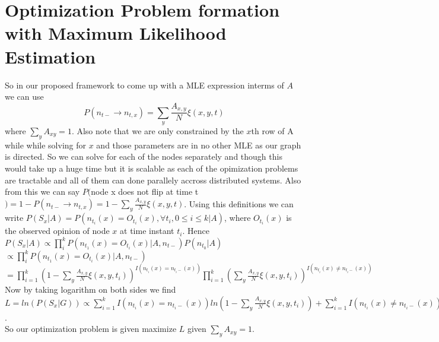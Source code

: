\section*{Optimization Problem formation with Maximum Likelihood Estimation}
So in our proposed framework to come up with a MLE expression interms of $A$ we can use 
\begin{equation}
P(n_{t-} \rightarrow n_{t,x}) = \displaystyle\sum_{y} \frac{A_{x,y}}{N} \xi (x,y,t)
\end{equation}
where $\displaystyle\sum_{y} A_{xy}= 1$. Also note that we are only constrained by the $x$th row of A while while solving for $x$ and those parameters are in no other MLE as our graph is directed. So we can solve for each of the nodes separately and though this would take up a huge time but it is scalable as each of the opimization problems are tractable and all of them can done parallely accross distributed systems. Also from this we can say $P($node x does not flip at time t$) = 1 - P(n_{t-} \rightarrow n_{t,x}) = 1 - \displaystyle\sum_{y} \frac{A_{x,y}}{N} \xi (x,y,t)$. Using this definitions we can write $P(S_x|A) = P(n_{t_{i}}(x) = O_{t_{i}}(x),\forall t_i, 0 \leq i \leq k|A)$, where $O_{t_{i}}(x)$ is the observed opinion of node $x$ at time instant $t_i$. Hence\\
$P(S_x|A) \propto \displaystyle\prod_{i}^{k} P(n_{t_1}(x) = O_{t_i}(x)|A,n_{t-})P(n_{t_0}|A)$\\
$ \propto \displaystyle\prod_{i}^{k} P(n_{t_1}(x) = O_{t_i}(x)|A,n_{t-})$\\
$ = \displaystyle\prod_{i=1}^{k}(1 - \displaystyle\sum_{y} \frac{A_{x,y}}{N} \xi (x,y,t_i))^{I(n_{t_i}(x) = n_{t_i -}(x))}\displaystyle\prod_{i=1}^{k}(\displaystyle\sum_{y} \frac{A_{x,y}}{N} \xi (x,y,t_i))^{I(n_{t_i}(x) \neq n_{t_i -}(x))}$
\\
Now by taking logarithm on both sides we find
\\ $L = ln(P(S_{x}|G)) \propto \displaystyle\sum_{i=1}^{k}I(n_{t_i}(x) = n_{t_i -}(x))ln(1 - \displaystyle\sum_{y} \frac{A_{x,y}}{N} \xi (x,y,t_i)) + \displaystyle\sum_{i=1}^{k}I(n_{t_i}(x) \neq n_{t_i -}(x))ln(\displaystyle\sum_{y} \frac{A_{x,y}}{N} \xi (x,y,t_i))$.
\\
So our optimization problem is given maximize $L$ given $\displaystyle\sum_{y} A_{xy}= 1$.
